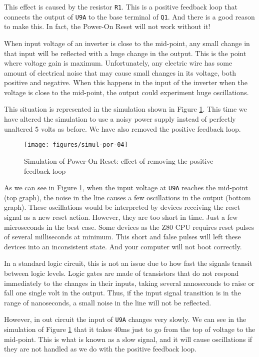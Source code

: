 This effect is caused by the resistor {\tt R1}. This is a positive feedback loop that connects the output of {\tt U9A} to the base terminal of {\tt Q1}. And there is a good reason to make this. In fact, the Power-On Reset will not work without it!

When input voltage of an inverter is close to the mid-point, any small change in that input will be reflected with a huge change in the output. This is the point where voltage gain is maximum. Unfortunately, any electric wire has some amount of electrical noise that may cause small changes in its voltage, both positive and negative. When this happens in the input of the inverter when the voltage is close to the mid-point, the output could experiment huge oscillations.

This situation is represented in the simulation shown in Figure \ref{fig:simul-por-04}. This time we have altered the simulation to use a noisy power supply instead of perfectly unaltered 5 volts as before. We have also removed the positive feedback loop.

\begin{figure}[htb]
  \centering
  \texttt{[image: figures/simul-por-04]}
  \caption{Simulation of Power-On Reset: effect of removing the positive feedback loop}
  \label{fig:simul-por-04}
\end{figure}

As we can see in Figure \ref{fig:simul-por-04}, when the input voltage at {\tt U9A} reaches the mid-point (top graph), the noise in the line causes a few oscillations in the output (bottom graph). These oscillations would be interpreted by devices receiving the reset signal as a new reset action. However, they are too short in time. Just a few microseconds in the best case. Some devices as the Z80 CPU requires reset pulses of several milliseconds at minimum. This short and false pulses will left these devices into an inconsistent state. And your computer will not boot correctly.

In a standard logic circuit, this is not an issue due to how fast the signals transit between logic levels. Logic gates are made of transistors that do not respond immediately to the changes in their inputs, taking several nanoseconds to raise or fall one single volt in the output. Thus, if the input signal transition is in the range of nanoseconds, a small noise in the line will not be reflected.

However, in out circuit the input of {\tt U9A} changes very slowly. We can see in the simulation of Figure \ref{fig:simul-por-04} that it takes 40ms just to go from the top of voltage to the mid-point. This is what is known as a slow signal, and it will cause oscillations if they are not handled as we do with the positive feedback loop.

